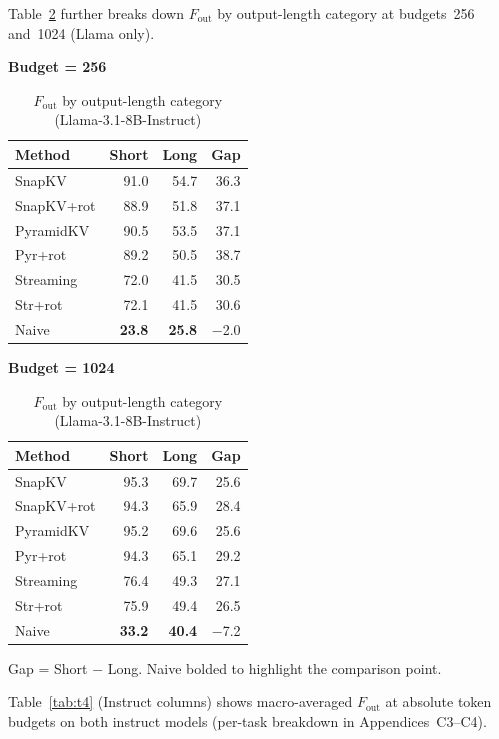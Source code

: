\documentclass[10pt,letterpaper]{article}
\begin{document}
Table~\ref{tab:instruct-fout-shortlong} further breaks down \(F_{\text{out}}\) by output-length category at budgets~256 and~1024 (Llama only).

\begin{table}[H]
\centering
\small
\caption{\(F_{\text{out}}\) by output-length category (Llama-3.1-8B-Instruct)}
\label{tab:instruct-fout-shortlong}
\begin{minipage}[t]{0.47\textwidth}
\centering
\textbf{Budget = 256}\\[4pt]
\begin{tabular}{@{}lrrr@{}}
\toprule
Method & Short & Long & Gap\\
\midrule
SnapKV     & 91.0 & 54.7 & 36.3\\
SnapKV+rot & 88.9 & 51.8 & 37.1\\
PyramidKV  & 90.5 & 53.5 & 37.1\\
Pyr+rot    & 89.2 & 50.5 & 38.7\\
Streaming  & 72.0 & 41.5 & 30.5\\
Str+rot   & 72.1 & 41.5 & 30.6\\
Naive      & \textbf{23.8} & \textbf{25.8} & $-$2.0\\
\bottomrule
\end{tabular}
\end{minipage}
\hfill
\begin{minipage}[t]{0.47\textwidth}
\centering
\textbf{Budget = 1024}\\[4pt]
\begin{tabular}{@{}lrrr@{}}
\toprule
Method & Short & Long & Gap\\
\midrule
SnapKV     & 95.3 & 69.7 & 25.6\\
SnapKV+rot & 94.3 & 65.9 & 28.4\\
PyramidKV  & 95.2 & 69.6 & 25.6\\
Pyr+rot    & 94.3 & 65.1 & 29.2\\
Streaming  & 76.4 & 49.3 & 27.1\\
Str+rot   & 75.9 & 49.4 & 26.5\\
Naive      & \textbf{33.2} & \textbf{40.4} & $-$7.2\\
\bottomrule
\end{tabular}
\end{minipage}

\medskip
Gap = Short $-$ Long.  Naive bolded to highlight the comparison point.
\end{table}

Table~\ref{tab:t4} (Instruct columns) shows macro-averaged \(F_{\text{out}}\) at absolute token budgets on both instruct models (per-task breakdown in Appendices~C3--C4).
\end{document}
